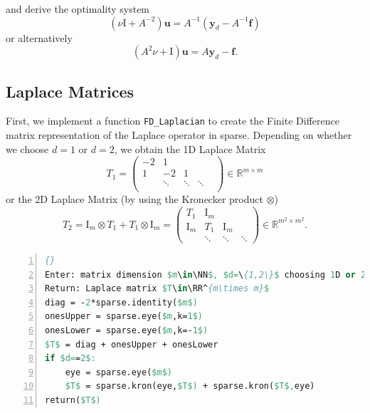 \documentclass{amsart}
\theoremstyle{definition}
\theoremstyle{remark}
\numberwithin{equation}{section}
\newcommand{\RR}{\mathbb{R}}
\newcommand{\NN}{\mathbb{N}}
\renewcommand{\vec}{\textbf}
\begin{document}
and derive the optimality system
\begin{equation}
\left(\nu\text{I}+A^{-2}\right) \vec{u} =A^{-1}\left(\vec{y}_d-A^{-1}\vec{f}\right) \label{eq:normalOptimalitySystem}
\end{equation}
or alternatively
\begin{equation}
\left(A^2\nu+\text{I}\right) \vec{u} =A\vec{y}_d-\vec{f}. \label{eq:factoredOptimalitySystem}
\end{equation}





\subsection{Laplace Matrices}
First, we implement a function \texttt{FD\_Laplacian} to create the Finite Difference matrix representation of the Laplace operator in sparse.
Depending on whether we choose $d=1$ or $d=2$, we obtain the 1D Laplace Matrix 
$$ T_1 = 
\begin{pmatrix}
-2 & 1 & & & \\
1 & -2 & 1 & & \\
& \ddots & \ddots & \ddots & \\
\end{pmatrix} \in\RR^{m\times m}
$$
or the 2D Laplace Matrix (by using the Kronecker product $\otimes$)
$$ T_2 = \text{I}_m \otimes T_1 + T_1 \otimes \text{I}_m= 
\begin{pmatrix}
T_1 & \text{I}_m & & \\
\text{I}_m & T_1 & \text{I}_m & \\
& \ddots & \ddots & \ddots
\end{pmatrix} \in\RR^{m^2\times m^2}.
$$

\begin{lstlisting}[mathescape, language=Pascal, title=FD\_Laplacian,
frame=single, numbers=left, numberstyle=\tiny, tabsize=2,
morekeywords={Enter, Return, elif}, deletekeywords={of,or}, keywordstyle=\bfseries]{}
Enter: matrix dimension $m\in\NN$, $d=\{1,2\}$ choosing 1D or 2D
Return: Laplace matrix $T\in\RR^{m\times m}$
diag = -2*sparse.identity($m$)
onesUpper = sparse.eye($m,k=1$)
onesLower = sparse.eye($m,k=-1$)
$T$ = diag + onesUpper + onesLower
if $d==2$:
	eye = sparse.eye($m$)
	$T$ = sparse.kron(eye,$T$) + sparse.kron($T$,eye)
return($T$)
\end{lstlisting}
\end{document}
